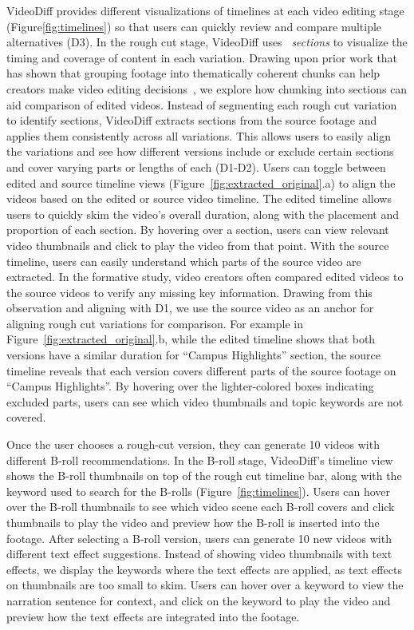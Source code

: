 VideoDiff provides different visualizations of timelines at each video editing stage (Figure\ref{fig:timelines}) so that users can quickly review and compare multiple alternatives (D3). 
In the rough cut stage, VideoDiff uses ~\textit{sections} to visualize the timing and coverage of content in each variation.
Drawing upon prior work that has shown that grouping footage into thematically coherent chunks can help creators make video editing decisions~\cite{leake2020generating, huh2023avscript}, we explore how chunking into sections can aid comparison of edited videos. 
Instead of segmenting each rough cut variation to identify sections, VideoDiff extracts sections from the source footage and applies them consistently across all variations. This allows users to easily align the variations and see how different versions include or exclude certain sections and cover varying parts or lengths of each (D1-D2). 
Users can toggle between edited and source timeline views (Figure~\ref{fig:extracted_original}.a) to align the videos based on the edited or source video timeline. The edited timeline allows users to quickly skim the video's overall duration, along with the placement and proportion of each section. By hovering over a section, users can view relevant video thumbnails and click to play the video from that point.
With the source timeline, users can easily understand which parts of the source video are extracted. In the formative study, video creators often compared edited videos to the source videos to verify any missing key information. Drawing from this observation and aligning with D1, we use the source video as an anchor for aligning rough cut variations for comparison. 
For example in Figure~\ref{fig:extracted_original}.b, while the edited timeline shows that both versions have a similar duration for ``Campus Highlights'' section, the source timeline reveals that each version covers different parts of the source footage on ``Campus Highlights''. By hovering over the lighter-colored boxes indicating excluded parts, users can see which video thumbnails and topic keywords are not covered.



Once the user chooses a rough-cut version, they can generate 10 videos with different B-roll recommendations. In the B-roll stage, VideoDiff's timeline view shows the B-roll thumbnails on top of the rough cut timeline bar, along with the keyword used to search for the B-rolls (Figure~\ref{fig:timelines}). Users can hover over the B-roll thumbnails to see which video scene each B-roll covers and click thumbnails to play the video and preview how the B-roll is inserted into the footage. After selecting a B-roll version, users can generate 10 new videos with different text effect suggestions. Instead of showing video thumbnails with text effects, we display the keywords where the text effects are applied, as text effects on thumbnails are too small to skim.
Users can hover over a keyword to view the narration sentence for context, and click on the keyword to play the video and preview how the text effects are integrated into the footage.




